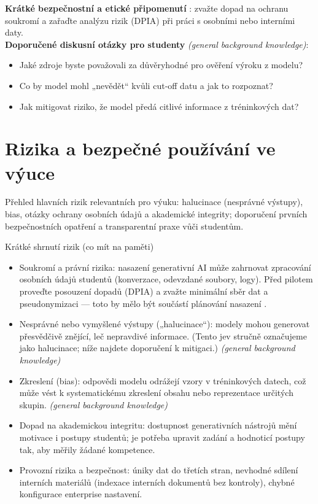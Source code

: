 \documentclass{report}%
\begin{document}
\noindent\textbf{Krátké bezpečnostní a etické připomenutí} \cite{kb_malinka_chatgpt_ve_vyuce_dva_roky_pote_2024_pdf_90bc3aaf_page_12_1}: zvažte dopad na ochranu soukromí a zařaďte analýzu rizik (DPIA) při práci s osobními nebo interními daty.\\[6pt]
\noindent\textbf{Doporučené diskusní otázky pro studenty} \emph{(general background knowledge)}: \begin{itemize}
  \item Jaké zdroje byste považovali za důvěryhodné pro ověření výroku z modelu?
  \item Co by model mohl „nevědět“ kvůli cut‑off datu a jak to rozpoznat?
  \item Jak mitigovat riziko, že model předá citlivé informace z tréninkových dat?
\end{itemize}%

%
\section{Rizika a bezpečné používání ve výuce}%
Přehled hlavních rizik relevantních pro výuku: halucinace (nesprávné výstupy), bias, otázky ochrany osobních údajů a akademické integrity; doporučení prvních bezpečnostních opatření a transparentní praxe vůči studentům.%


%
Krátké shrnutí rizik (co mít na paměti)
\begin{itemize}
  \item Soukromí a právní rizika: nasazení generativní AI může zahrnovat zpracování osobních údajů studentů (konverzace, odevzdané soubory, logy). Před pilotem proveďte posouzení dopadů (DPIA) a zvažte minimální sběr dat a pseudonymizaci — toto by mělo být součástí plánování nasazení \cite{kb_malinka_chatgpt_ve_vyuce_dva_roky_pote_2024_pdf_90bc3aaf_page_12_1}. 
  \item Nesprávné nebo vymyšlené výstupy („halucinace“): modely mohou generovat přesvědčivě znějící, leč nepravdivé informace. (Tento jev stručně označujeme jako halucinace; níže najdete doporučení k mitigaci.) \emph{(general background knowledge)}
  \item Zkreslení (bias): odpovědi modelu odrážejí vzory v tréninkových datech, což může vést k systematickému zkreslení obsahu nebo reprezentace určitých skupin. \emph{(general background knowledge)}
  \item Dopad na akademickou integritu: dostupnost generativních nástrojů mění motivace i postupy studentů; je potřeba upravit zadání a hodnoticí postupy tak, aby měřily žádané kompetence.
  \item Provozní rizika a bezpečnost: úniky dat do třetích stran, nevhodné sdílení interních materiálů (indexace interních dokumentů bez kontroly), chybné konfigurace enterprise nastavení.
\end{itemize}
\end{document}
